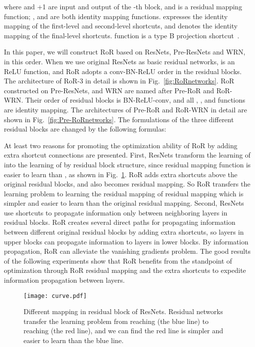\documentclass[journal]{IEEEtran}
\begin{document}
where  and +1 are input and output of the -th block, and  is a residual mapping function; , and  are both identity mapping functions.  expresses the identity mapping of the first-level and second-level shortcuts, and  denotes the identity mapping of the final-level shortcuts.  function is a type B projection shortcut~\cite{he2015resnets}.
\par 
In this paper, we will construct RoR based on ResNets, Pre-ResNets and WRN, in this order. When we use original ResNets as basic residual networks,  is an ReLU function, and RoR adopts a conv-BN-ReLU order in the residual blocks. The architecture of RoR-3 in detail is shown in Fig.~\ref{fig:RoRnetworks}. RoR constructed on Pre-ResNets, and WRN are named after Pre-RoR and RoR-WRN. Their order of residual blocks is BN-ReLU-conv, and all , , and  functions are identity mapping. The architectures of Pre-RoR and RoR-WRN in detail are shown in Fig.~\ref{fig:Pre-RoRnetworks}. The formulations of the three different residual blocks are changed by the following formulas:



\par 
At least two reasons for promoting the optimization ability of RoR by adding extra shortcut connections are presented. First, ResNets transform the learning of  into the learning of  by residual block structure, since residual mapping function  is easier to learn than , as shown in Fig.~\ref{fig:curve}. RoR adds extra shortcuts above the original residual blocks, and  also becomes residual mapping. So RoR transfers the learning problem to learning the residual mapping of residual mapping which is simpler and easier to learn than the original residual mapping. Second, ResNets use shortcuts to propagate information only between neighboring layers in residual blocks. RoR creates several direct paths for propagating information between different original residual blocks by adding extra shortcuts, so layers in upper blocks can propagate information to layers in lower blocks. By information propagation, RoR can alleviate the vanishing gradients problem. The good results of the following experiments show that RoR benefits from the standpoint of optimization through RoR residual mapping and the extra shortcuts to expedite information propagation between layers.
\begin{figure}
\centering
\texttt{[image: curve.pdf]}
\caption{Different mapping in residual block of ResNets. Residual networks transfer the learning problem from reaching  (the blue line) to reaching  (the red line), and we can find the red line is simpler and easier to learn than the blue line. }
\label{fig:curve}
\end{figure}
\end{document}
